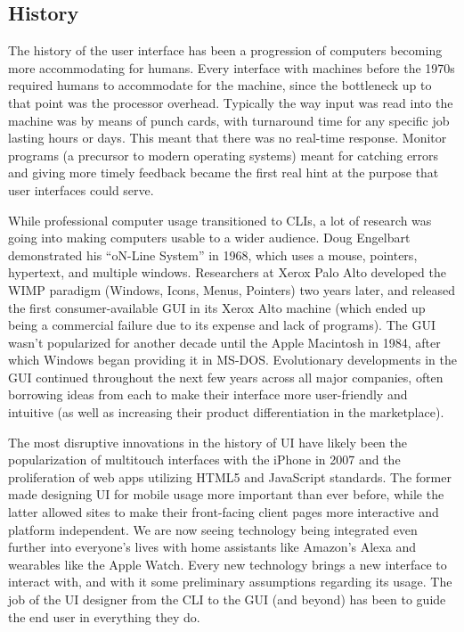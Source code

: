 \documentclass[12pt, oneside]{article}
\begin{document}
\subsection{History}

The history of the user interface has been a progression of computers becoming more accommodating for humans. Every interface with machines before the 1970s required humans to accommodate for the machine, since the bottleneck up to that point was the processor overhead. Typically the way input was read into the machine was by means of punch cards, with turnaround time for any specific job lasting hours or days. This meant that there was no real-time response. Monitor programs (a precursor to modern operating systems) meant for catching errors and giving more timely feedback became the first real hint at the purpose that user interfaces could serve.

While professional computer usage transitioned to CLIs, a lot of research was going into making computers usable to a wider audience. Doug Engelbart demonstrated his ``oN-Line System'' in 1968, which uses a mouse, pointers, hypertext, and multiple windows. Researchers at Xerox Palo Alto developed the WIMP paradigm (Windows, Icons, Menus, Pointers) two years later, and released the first consumer-available GUI in its Xerox Alto machine (which ended up being a commercial failure due to its expense and lack of programs). The GUI wasn't popularized for another decade until the Apple Macintosh in 1984, after which Windows began providing it in MS-DOS. Evolutionary developments in the GUI continued throughout the next few years across all major companies, often borrowing ideas from each to make their interface more user-friendly and intuitive (as well as increasing their product differentiation in the marketplace).

The most disruptive innovations in the history of UI have likely been the popularization of multitouch interfaces with the iPhone in 2007 and the proliferation of web apps utilizing HTML5 and JavaScript standards. The former made designing UI for mobile usage more important than ever before, while the latter allowed sites to make their front-facing client pages more interactive and platform independent. We are now seeing technology being integrated even further into everyone's lives with home assistants like Amazon's Alexa and wearables like the Apple Watch. Every new technology brings a new interface to interact with, and with it some preliminary assumptions regarding its usage. The job of the UI designer from the CLI to the GUI (and beyond) has been to guide the end user in everything they do.
\end{document}
